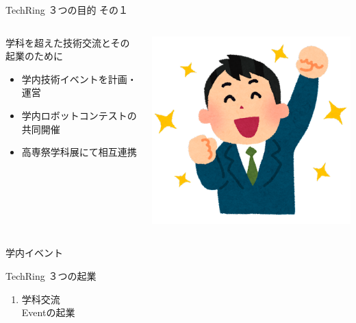 \documentclass[dvipdfmx]{beamer}
\begin{document}
\begin{frame}{TechRing ３つの目的 その１}

  \begin{columns}[totalwidth=\textwidth]
    \begin{column}{0.7\textwidth}
      \begin{greyblock}{学科を超えた技術交流とその起業のために}
        \vspace{1mm}
        \begin{itemize}
          \item \alert{学内技術イベントを計画・運営}
          \item \alert{学内ロボットコンテストの共同開催}
          \item \alert{高専祭学科展にて相互連携}
        \end{itemize}
      \end{greyblock}
    \end{column}
    \begin{column}{0.25\textwidth}
      \includegraphics[scale=.25]{pic/mokuhyou1.png}
    \end{column}
  \end{columns}

  \begin{columns}
    \begin{column}{0.30\textwidth}
      \begin{alertblock}{学内イベント}
        \begin{footnotesize}
          TechRing ３つの起業
          \begin{enumerate}
            \item 学科交流\\Eventの起業
          \end{enumerate}
        \end{footnotesize}
      \end{alertblock}
    \end{column}


\end{columns}
\end{frame}
\end{document}
